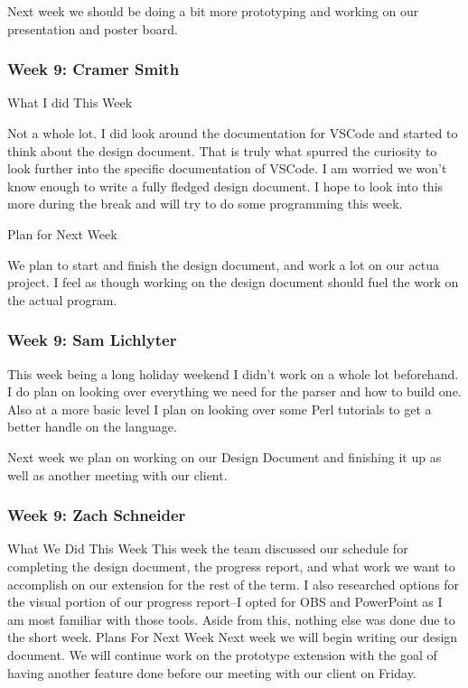 Next week we should be doing a bit more prototyping and working on our presentation and poster board.

\subsubsection{Week 9: Cramer Smith}

What I did This Week

Not a whole lot. I did look around the documentation for VSCode and started to think about the design document. That is truly what spurred the curiosity to look further into the specific documentation of VSCode. I am worried we won't know enough to write a fully fledged design document. I hope to look into this more during the break and will try to do some programming this week. 

Plan for Next Week

We plan to start and finish the design document, and work a lot on our actua project. I feel as though working on the design document should fuel the work on the actual program.  

\subsubsection{Week 9: Sam Lichlyter}

This week being a long holiday weekend I didn't work on a whole lot beforehand. I do plan on looking over everything we need for the parser and how to build one. Also at a more basic level I plan on looking over some Perl tutorials to get a better handle on the language. 

Next week we plan on working on our Design Document and finishing it up as well as another meeting with our client. 

\subsubsection{Week 9: Zach Schneider}

What We Did This Week
This week the team discussed our schedule for completing the design document, the progress report, and what work we want to accomplish on our extension for the rest of the term. I also researched options for the visual portion of our progress report--I opted for OBS and PowerPoint as I am most familiar with those tools. Aside from this, nothing else was done due to the short week.
Plans For Next Week
Next week we will begin writing our design document. We will continue work on the prototype extension with the goal of having another feature done before our meeting with our client on Friday.

